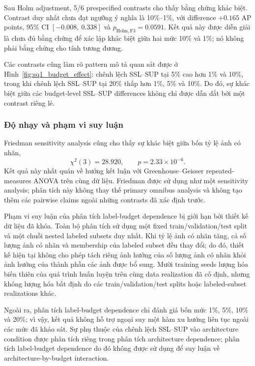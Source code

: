 \documentclass[pdflatex,sn-mathphys-num]{sn-jnl}%
\theoremstyle{thmstyleone}%
\theoremstyle{thmstyletwo}%
\theoremstyle{thmstylethree}%
\begin{document}
Sau Holm adjustment, 5/6 prespecified contrasts cho thấy bằng chứng khác biệt. Contrast duy nhất chưa đạt ngưỡng ý nghĩa là 10\%--1\%, với difference $+0.165$ AP points, 95\% CI $[-0.008,\ 0.338]$ và $p_{\mathrm{Holm,F3}}=0.0591$. Kết quả này được diễn giải là chưa đủ bằng chứng để xác lập khác biệt giữa hai mức 10\% và 1\%; nó không phải bằng chứng cho tính tương đương.

Các contrasts cũng làm rõ pattern mô tả quan sát được ở Hình~\ref{fig:sq1_budget_effect}: chênh lệch SSL--SUP tại 5\% cao hơn 1\% và 10\%, trong khi chênh lệch SSL--SUP tại 20\% thấp hơn 1\%, 5\% và 10\%. Do đó, sự khác biệt giữa các budget-level SSL--SUP differences không chỉ được dẫn dắt bởi một contrast riêng lẻ.

\subsubsection{Độ nhạy và phạm vi suy luận}

Friedman sensitivity analysis cũng cho thấy sự khác biệt giữa bốn tỷ lệ ảnh có nhãn,
\begin{equation}
\chi^2(3)=28.920,\qquad p=2.33\times10^{-6}.
\label{eq:results_friedman_sensitivity}
\end{equation}
Kết quả này nhất quán về hướng kết luận với Greenhouse--Geisser repeated-measures ANOVA trên cùng dữ liệu. Friedman được sử dụng như một sensitivity analysis; phân tích này không thay thế primary omnibus analysis và không tạo thêm các pairwise claims ngoài những contrasts đã xác định trước.

Phạm vi suy luận của phân tích label-budget dependence bị giới hạn bởi thiết kế dữ liệu đã khóa. Toàn bộ phân tích sử dụng một fixed train/validation/test split và một chuỗi nested labeled subsets duy nhất. Khi tỷ lệ ảnh có nhãn tăng, cả số lượng ảnh có nhãn và membership của labeled subset đều thay đổi; do đó, thiết kế hiện tại không cho phép tách riêng ảnh hưởng của số lượng ảnh có nhãn khỏi ảnh hưởng của thành phần các ảnh được bổ sung. Mười training seeds lượng hóa biến thiên của quá trình huấn luyện trên cùng data realization đã cố định, nhưng không lượng hóa bất định do các train/validation/test splits hoặc labeled-subset realizations khác.

Ngoài ra, phân tích label-budget dependence chỉ đánh giá bốn mức 1\%, 5\%, 10\% và 20\%; vì vậy, kết quả không hỗ trợ ngoại suy một hàm xu hướng liên tục ngoài các mức đã khảo sát. Sự phụ thuộc của chênh lệch SSL--SUP vào architecture condition được phân tích riêng trong phân tích architecture dependence; phân tích label-budget dependence do đó không được sử dụng để suy luận về architecture-by-budget interaction.
\end{document}
